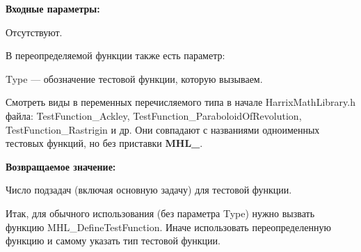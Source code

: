 \textbf{Входные параметры:}

Отсутствуют.

В переопределяемой функции также есть параметр:
  
Type --- обозначение тестовой функции, которую вызываем.

Смотреть виды в переменных перечисляемого типа в начале HarrixMathLibrary.h файла: TestFunction\_Ackley, TestFunction\_ParaboloidOfRevolution, TestFunction\_Rastrigin и др. Они совпадают с названиями одноименных тестовых функций, но без приставки \textbf{MHL\_}.

\textbf{Возвращаемое значение:}
 
Число подзадач (включая основную задачу) для тестовой функции.

Итак, для обычного использования (без параметра Type) нужно вызвать функцию MHL\_DefineTestFunction. Иначе использовать переопределенную функцию и самому указать тип тестовой функции.